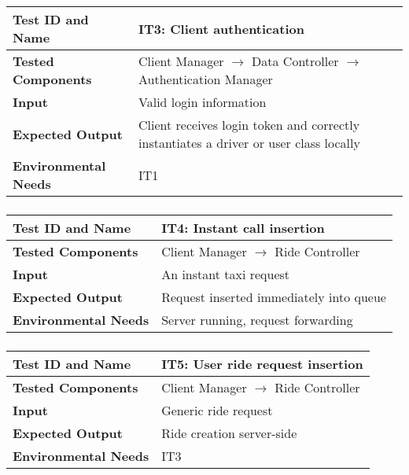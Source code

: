 \begin{tabular}{l p{}}
    \hline
    \textbf{Test ID and Name} & \textbf{IT3: Client authentication}\\
    \hline
    \textbf{Tested Components} & Client Manager $\rightarrow$ Data Controller $\rightarrow$ Authentication Manager\\
    \hline
    \textbf{Input} & Valid login information\\
    \hline
    \textbf{Expected Output} & Client receives login token and correctly instantiates a driver or user class locally\\
    \hline
    \textbf{Environmental Needs} & IT1\\
    \hline
\end{tabular}

\subsubsection{}

\begin{tabular}{l p{}}
    \hline
    \textbf{Test ID and Name} & \textbf{IT4: Instant call insertion}\\
    \hline
    \textbf{Tested Components} & Client Manager $\rightarrow$ Ride Controller\\
    \hline
    \textbf{Input} & An instant taxi request\\
    \hline
    \textbf{Expected Output} & Request inserted immediately into queue\\
    \hline
    \textbf{Environmental Needs} & Server running, request forwarding\\
    \hline
\end{tabular}

\subsubsection{}

\begin{tabular}{l p{}}
    \hline
    \textbf{Test ID and Name} & \textbf{IT5: User ride request insertion}\\
    \hline
    \textbf{Tested Components} & Client Manager $\rightarrow$ Ride Controller\\
    \hline
    \textbf{Input} & Generic ride request\\
    \hline
    \textbf{Expected Output} & Ride creation server-side\\
    \hline
    \textbf{Environmental Needs} & IT3\\
    \hline
\end{tabular}

